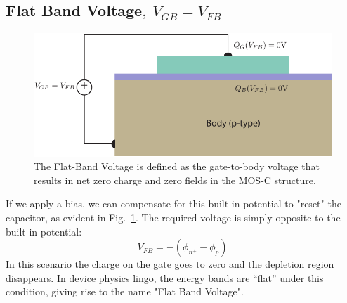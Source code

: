 \subsection{Flat Band Voltage\texorpdfstring{$,\;V_{GB}=V_{FB}$}{}}
\begin{figure}[tbh]
\centering
\includegraphics[width=.75\columnwidth]{mos_cap_flatband}
\caption{The Flat-Band Voltage is defined as the gate-to-body voltage that results in net zero charge and zero fields in the MOS-C structure.}
\label{fig:mos_flatband}
\end{figure}
If we apply a bias, we can compensate for this built-in potential to "reset" the capacitor, as evident in Fig.~\ref{fig:mos_flatband}.  The required voltage is simply opposite to the built-in potential:
    \begin{equation}
        {V_{FB}} =  - ({\phi _{{n^ + }}} - {\phi _p})
    \end{equation}
In this scenario the charge on the gate goes to zero and the depletion region disappears.  In device physics lingo, the energy bands are “flat” under this condition, giving rise to the name "Flat Band Voltage".
